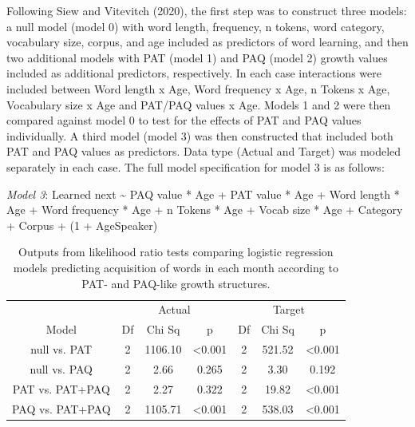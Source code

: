 \documentclass[
  man,mask,floatsintext]{apa6}
\begin{document}
Following Siew and Vitevitch (2020), the first step was to construct three models: a null model (model 0) with word length, frequency, n tokens, word category, vocabulary size, corpus, and age included as predictors of word learning, and then two additional models with PAT (model 1) and PAQ (model 2) growth values included as additional predictors, respectively. In each case interactions were included between Word length x Age, Word frequency x Age, n Tokens x Age, Vocabulary size x Age and PAT/PAQ values x Age. Models 1 and 2 were then compared against model 0 to test for the effects of PAT and PAQ values individually. A third model (model 3) was then constructed that included both PAT and PAQ values as predictors. Data type (Actual and Target) was modeled separately in each case. The full model specification for model 3 is as follows:

\emph{Model 3}: Learned next \textasciitilde{} PAQ value * Age +
PAT value * Age +
Word length * Age +
Word frequency * Age +
n Tokens * Age +
Vocab size * Age +
Category +
Corpus +
(1 + Age\textbar Speaker)

\begin{longtable}[t]{ccccccc}
\caption{\label{tab:table-model-outputs}Outputs from likelihood ratio tests comparing logistic regression models predicting acquisition of words in each month according to PAT- and PAQ-like growth structures.}\\
\toprule
\multicolumn{1}{c}{ } & \multicolumn{3}{c}{Actual} & \multicolumn{3}{c}{Target} \\
\cmidrule(l{3pt}r{3pt}){2-4} \cmidrule(l{3pt}r{3pt}){5-7}
Model & Df & Chi Sq & p & Df & Chi Sq & p\\
\midrule
null vs. PAT & 2 & 1106.10 & <0.001 & 2 & 521.52 & <0.001\\
null vs. PAQ & 2 & 2.66 & 0.265 & 2 & 3.30 & 0.192\\
PAT vs. PAT+PAQ & 2 & 2.27 & 0.322 & 2 & 19.82 & <0.001\\
PAQ vs. PAT+PAQ & 2 & 1105.71 & <0.001 & 2 & 538.03 & <0.001\\
\midrule
\bottomrule
\end{longtable}
\end{document}
